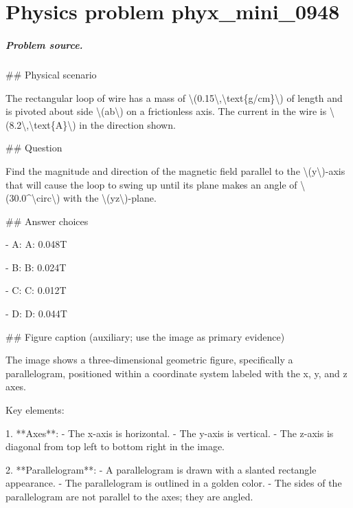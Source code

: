 
\chapter{Physics problem phyx\_mini\_0948}
\label{ch:PhyXMiniProblems_problem_phyx_mini_0948}

\paragraph{Problem source.}
\#\# Physical scenario

The rectangular loop of wire has a mass of \textbackslash{}(0.15\textbackslash{},\textbackslash{}text\{g/cm\}\textbackslash{}) of length and is pivoted about side \textbackslash{}(ab\textbackslash{}) on a frictionless axis. The current in the wire is \textbackslash{}(8.2\textbackslash{},\textbackslash{}text\{A\}\textbackslash{}) in the direction shown.

\#\# Question

Find the magnitude and direction of the magnetic field parallel to the \textbackslash{}(y\textbackslash{})-axis that will cause the loop to swing up until its plane makes an angle of \textbackslash{}(30.0\textasciicircum{}\textbackslash{}circ\textbackslash{}) with the \textbackslash{}(yz\textbackslash{})-plane.

\#\# Answer choices

- A: A: 0.048T

- B: B: 0.024T

- C: C: 0.012T

- D: D: 0.044T

\#\# Figure caption (auxiliary; use the image as primary evidence)

The image shows a three-dimensional geometric figure, specifically a parallelogram, positioned within a coordinate system labeled with the x, y, and z axes. 

Key elements:

1. **Axes**: 
   - The x-axis is horizontal.
   - The y-axis is vertical.
   - The z-axis is diagonal from top left to bottom right in the image.

2. **Parallelogram**:
   - A parallelogram is drawn with a slanted rectangle appearance.
   - The parallelogram is outlined in a golden color.
   - The sides of the parallelogram are not parallel to the axes; they are angled.

